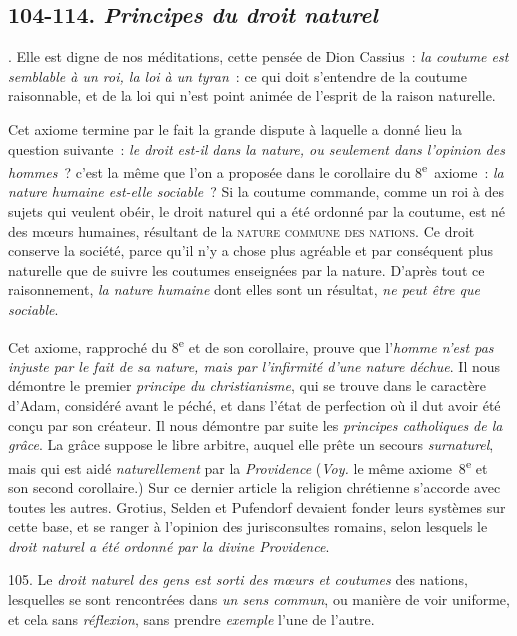 \documentclass[french,twoside]{book} %
\begin{document}
\subsection[{104-114. Principes du droit naturel}]{ \textsc{104-114. } {\itshape Principes du droit naturel} }
. Elle est digne de nos méditations, cette pensée de Dion Cassius : \emph{{\itshape la coutume est semblable à un roi, la loi à un tyran}} : ce qui doit s’entendre de la coutume raisonnable, et de la loi qui n’est point animée de l’esprit de la raison naturelle.\par
Cet axiome termine par le fait la grande dispute à laquelle a donné lieu la question suivante : {\itshape le droit est-il dans la nature, ou seulement dans l’opinion des hommes} ? c’est la même que l’on a proposée dans le corollaire du 8\textsuperscript{e} axiome : {\itshape la nature humaine est-elle sociable} ? Si la coutume commande, comme un roi à des sujets qui veulent obéir, le droit naturel qui a été ordonné par la coutume, est né des mœurs humaines, résultant de la {\scshape nature commune des nations}. Ce droit conserve la société, parce qu’il n’y a chose plus agréable et par conséquent plus naturelle que de suivre les coutumes enseignées par la nature. D’après tout ce raisonnement, {\itshape la nature humaine} dont elles sont un résultat, {\itshape ne peut être que sociable}.\par
Cet axiome, rapproché du 8\textsuperscript{e} et de son corollaire, prouve que l’{\itshape homme n’est pas injuste par le fait de sa nature, mais par l’infirmité d’une nature déchue}. Il nous démontre le premier {\itshape principe du christianisme}, qui se trouve dans le caractère d’Adam, considéré avant le péché, et dans l’état de perfection où il dut avoir été conçu par son créateur. Il nous démontre par suite les {\itshape principes catholiques}  {\itshape de la grâce}. La grâce suppose le libre arbitre, auquel elle prête un secours {\itshape surnaturel}, mais qui est aidé {\itshape naturellement} par la {\itshape Providence} ({\itshape Voy.} le même axiome 8\textsuperscript{e} et son second corollaire.) Sur ce dernier article la religion chrétienne s’accorde avec toutes les autres. Grotius, Selden et Pufendorf devaient fonder leurs systèmes sur cette base, et se ranger à l’opinion des jurisconsultes romains, selon lesquels le {\itshape droit naturel a été ordonné par la divine Providence}.\par
\par
105. Le {\itshape droit naturel des gens est sorti des mœurs et coutumes} des nations, lesquelles se sont rencontrées dans {\itshape un sens commun}, ou manière de voir uniforme, et cela sans {\itshape réflexion}, sans prendre {\itshape exemple} l’une de l’autre.\par
\end{document}
